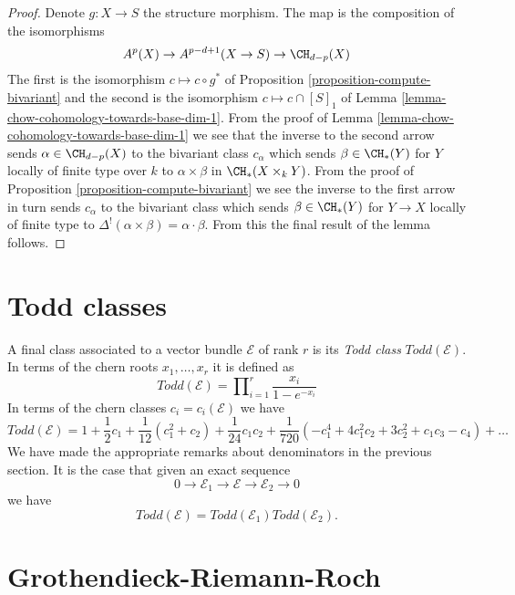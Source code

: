 \begin{proof}
Denote $g : X \to S$ the structure morphism.
The map is the composition of the isomorphisms
$$
A^p(X) \to A^{p - d + 1}(X \to S) \to \CH_{d - p}(X)
$$
The first is the isomorphism $c \mapsto c \circ g^*$ of
Proposition \ref{proposition-compute-bivariant}
and the second is the isomorphism $c \mapsto c \cap [S]_1$ of
Lemma \ref{lemma-chow-cohomology-towards-base-dim-1}.
From the proof of Lemma \ref{lemma-chow-cohomology-towards-base-dim-1}
we see that the inverse to the second arrow sends $\alpha \in \CH_{d - p}(X)$
to the bivariant class $c_\alpha$ which sends $\beta \in \CH_*(Y)$
for $Y$ locally of finite type over $k$
to $\alpha \times \beta$ in $\CH_*(X \times_k Y)$. From the proof of
Proposition \ref{proposition-compute-bivariant} we see the inverse
to the first arrow in turn sends $c_\alpha$ to the bivariant class
which sends $\beta \in \CH_*(Y)$ for $Y \to X$ locally of finite type
to $\Delta^!(\alpha \times \beta) = \alpha \cdot \beta$.
From this the final result of the lemma follows.
\end{proof}










\section{Todd classes}
\label{section-todd-classes}

\noindent
A final class associated to a vector bundle $\mathcal{E}$
of rank $r$ is its {\it Todd class} $Todd(\mathcal{E})$.
In terms of the chern roots $x_1, \ldots, x_r$ it is
defined as
$$
Todd(\mathcal{E})
=
\prod\nolimits_{i = 1}^r
\frac{x_i}{1 - e^{-x_i}}
$$
In terms of the chern classes $c_i = c_i(\mathcal{E})$
we have
$$
Todd(\mathcal{E})
=
1
+
\frac{1}{2}c_1
+
\frac{1}{12}(c_1^2 + c_2)
+
\frac{1}{24}c_1c_2
+
\frac{1}{720}(-c_1^4 + 4c_1^2c_2 + 3c_2^2 + c_1c_3 - c_4)
+
\ldots
$$
We have made the appropriate remarks about denominators
in the previous section. It is the case that
given an exact sequence
$$
0
\to
{\mathcal E}_1
\to
{\mathcal E}
\to
{\mathcal E}_2
\to
0
$$
we have
$$
Todd({\mathcal E}) = Todd({\mathcal E}_1) Todd({\mathcal E}_2).
$$







\section{Grothendieck-Riemann-Roch}
\label{section-grr}

